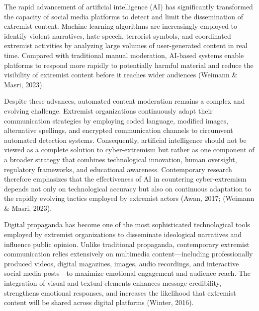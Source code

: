 \documentclass{NSP1}
\begin{document}
\par\medskip{}\smallskip

The rapid advancement of artificial intelligence (AI) has significantly transformed the capacity of social media platforms to detect and limit the dissemination of extremist content. Machine learning algorithms are increasingly employed to identify violent narratives, hate speech, terrorist symbols, and coordinated extremist activities by analyzing large volumes of user-generated content in real time. Compared with traditional manual moderation, AI-based systems enable platforms to respond more rapidly to potentially harmful material and reduce the visibility of extremist content before it reaches wider audiences (Weimann \& Masri, 2023).

Despite these advances, automated content moderation remains a complex and evolving challenge. Extremist organizations continuously adapt their communication strategies by employing coded language, modified images, alternative spellings, and encrypted communication channels to circumvent automated detection systems. Consequently, artificial intelligence should not be viewed as a complete solution to cyber-extremism but rather as one component of a broader strategy that combines technological innovation, human oversight, regulatory frameworks, and educational awareness. Contemporary research therefore emphasizes that the effectiveness of AI in countering cyber-extremism depends not only on technological accuracy but also on continuous adaptation to the rapidly evolving tactics employed by extremist actors (Awan, 2017; (Weimann \& Masri, 2023).

\par\medskip{}\smallskip

Digital propaganda has become one of the most sophisticated technological tools employed by extremist organizations to disseminate ideological narratives and influence public opinion. Unlike traditional propaganda, contemporary extremist communication relies extensively on multimedia content—including professionally produced videos, digital magazines, images, audio recordings, and interactive social media posts—to maximize emotional engagement and audience reach. The integration of visual and textual elements enhances message credibility, strengthens emotional responses, and increases the likelihood that extremist content will be shared across digital platforms (Winter, 2016).
\end{document}
